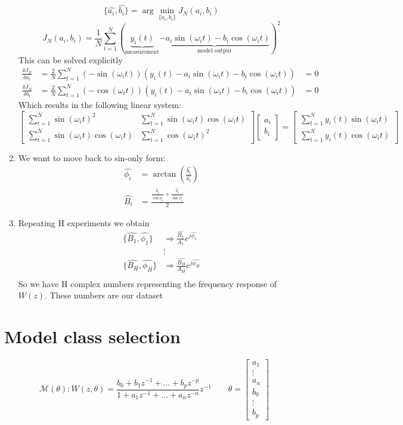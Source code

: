 \documentclass{article}
\begin{document}
\begin{enumerate}
\[
\{\hat{a_i},\hat{b_i}\}=\arg\min_{\{a_i,b_i\}} J_N(a_i,b_i)
\]
\[
J_N(a_i,b_i)=\frac{1}{N}\sum_{t=1}^{N} \left( 
\underbrace{
	y_i(t)
}_{
	\text{measurement}
}
\underbrace{
	-a_i\sin(\omega_it)
	-b_i\cos(\omega_it)
}_{
	\text{model output}
}
\right)^2
\]
This can be solved explicitly
\begin{align*}
\frac{\delta J_N}{\delta a_i}&=
\frac{2}{N}\sum_{t=1}^N
\left(-\sin(\omega_it)\right)
\left(y_i(t)-a_i\sin(\omega_it)-b_i\cos(\omega_it)\right)&=0\\
\frac{\delta J_N}{\delta b_i}&=
\frac{2}{N}\sum_{t=1}^N
\left(-\cos(\omega_it)\right)
\left(y_i(t)-a_i\sin(\omega_it)-b_i\cos(\omega_it)\right)&=0
\end{align*}
Which results in the following linear system:
\[
\begin{bmatrix}
\sum_{t=1}^N \sin(\omega_it)^2
&
\sum_{t=1}^N \sin(\omega_it)\cos(\omega_it)
\\
\sum_{t=1}^N \sin(\omega_it)\cos(\omega_it)
&
\sum_{t=1}^N \cos(\omega_it)^2
\end{bmatrix}
\begin{bmatrix}
a_i\\b_i
\end{bmatrix}
=
\begin{bmatrix}
\sum_{t=1}^N y_i(t)\sin(\omega_it)
\\
\sum_{t=1}^N y_i(t)\cos(\omega_it)
\end{bmatrix}
\]
\item We want to move back to sin-only form:
\begin{align*}
\hat{\phi_i}&=\arctan \left(\frac{\hat{b_i}}{\hat{a_i}}\right)\\
\hat{B_i}&=\frac{\frac{\hat{a_i}}{\cos\hat{\phi_i}}+\frac{\hat{b_i}}{\sin\hat{\phi_i}}}{2}
\end{align*}
\item Repeating H experiments we obtain
\begin{align*}
\{\hat{B_1},\hat{\phi_1}\} &\Rightarrow \frac{\hat{B_1}}{A_1}e^{j\hat{\phi_1}}\\
&\vdots\\
\{\hat{B_H},\hat{\phi_H}\} &\Rightarrow \frac{\hat{B_H}}{A_H}e^{j\hat{\phi_H}}\\
\end{align*}
So we have H complex numbers representing the frequency response of $W(z)$. These numbers are our dataset
\end{enumerate}
\section{Model class selection}
\[
\mathcal{M(\theta)}:
W(z,\theta)=
\frac{b_0+b_1z^{-1}+\dots+b_pz^{-p}}{1+a_1z^{-1}+\dots+a_nz^{-n}}
z^{-1}
\qquad
\theta=\begin{bmatrix}
a_1\\\vdots\\a_n\\b_0\\\vdots\\b_p
\end{bmatrix}
\]
\end{document}
